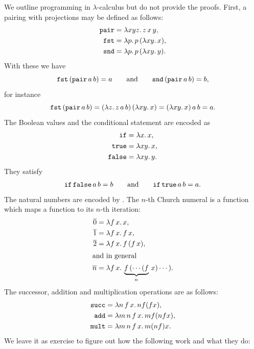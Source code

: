 We outline programming in $\lambda$-calculus but do not provide the proofs. First, a pairing with projections may be defined as follows:
%
\begin{align*}
  \mathtt{pair} &= \lambda x y z .\,z\, x\, y,
  \\
  \mathtt{fst} &= \lambda p .\,p \, (\lambda x y .\,x),
  \\
  \mathtt{snd} &= \lambda p .\,p \, (\lambda x y .\,y).
\end{align*}
%
With these we have
%
\begin{equation*}
  \mathtt{fst} \,(\mathtt{pair}\, a\, b) = a
  \qquad\text{and}\qquad
  \mathtt{snd} \,(\mathtt{pair}\, a\, b) = b,
\end{equation*}
%
for instance
%
\begin{equation*}
  \mathtt{fst} \, (\mathtt{pair}\, a\, b)
   = (\lambda z .\,z\, a\, b) \, (\lambda x y .\,x)
   = (\lambda x y .\,x) \, a \, b = a.
\end{equation*}
%
The Boolean values and the conditional statement are encoded as
%
\begin{align*}
  \mathtt{if} &= \lambda x .\,x,
  \\
  \mathtt{true} &= \lambda x y .\,x,
  \\
  \mathtt{false} &= \lambda x y .\,y.
\end{align*}
%
They satisfy
%
\begin{equation*}
  \mathtt{if}\,\mathtt{false}\,a\,b = b
  \qquad\text{and}\qquad
  \mathtt{if}\,\mathtt{true}\,a\,b = a.
\end{equation*}
%
The natural numbers are encoded by . The $n$-th
Church numeral is a function which maps a function to its $n$-th
iteration:
%
\begin{align*}
  \overline{0} &= \lambda f\,x .\,x,\\
  \overline{1} &= \lambda f\,x .\,f\,x,\\
  \overline{2} &= \lambda f\,x .\,f\,(f\,x),\\
  \intertext{and in general}
  \overline{n} &= \lambda f\,x .\,\underbrace{f\,(\cdots (f}_n\,x) \cdots).
\end{align*}
%
The successor, addition and multiplication operations are as follows:
%
\begin{align*}
  \mathtt{succ} &= \lambda n\,f\,x .\,n f (f x),\\
  \mathtt{add} &= \lambda m\,n\,f\,x .\,m f (n f x),\\
  \mathtt{mult} &= \lambda m\,n\,f\,x .\,m (n f) x.
\end{align*}
%
We leave it as exercise to figure out how the following work and what
they do:
